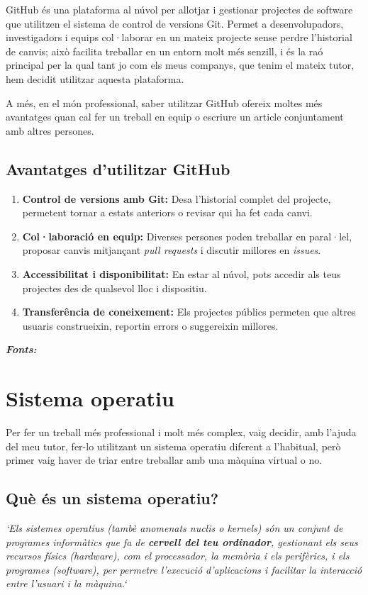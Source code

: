 GitHub és una plataforma al núvol per allotjar i gestionar projectes de software que utilitzen el sistema de control de versions Git. Permet a desenvolupadors, investigadors i equips col·laborar en un mateix projecte sense perdre l’historial de canvis; això facilita treballar en un entorn molt més senzill, i és la raó principal per la qual tant jo com els meus companys, que tenim el mateix tutor, hem decidit utilitzar aquesta plataforma.

A més, en el món professional, saber utilitzar GitHub ofereix moltes més avantatges quan cal fer un treball en equip o escriure un article conjuntament amb altres persones.

\subsection{Avantatges d’utilitzar GitHub}
\begin{enumerate}
 \item \textbf{Control de versions amb Git:} Desa l’historial complet del projecte, permetent tornar a estats anteriors o revisar qui ha fet cada canvi.
 \item \textbf{Col·laboració en equip:} Diverses persones poden treballar en paral·lel, proposar canvis mitjançant \textit{pull requests} i discutir millores en \textit{issues}.
 \item \textbf{Accessibilitat i disponibilitat:} En estar al núvol, pots accedir als teus projectes des de qualsevol lloc i dispositiu.
 \item \textbf{Transferência de coneixement:} Els projectes públics permeten que altres usuaris construeixin, reportin errors o suggereixin millores.
\end{enumerate}

\textit{\textbf{Fonts:}} \cite{GH}



\section{Sistema operatiu}
Per fer un treball més professional i molt més complex, vaig decidir, amb l’ajuda del meu tutor, fer-lo utilitzant un sistema operatiu diferent a l'habitual, però primer vaig haver de triar entre treballar amb una màquina virtual o no.


\subsection{Què és un sistema operatiu?}
\textit{`Els sistemes operatius (tambè anomenats nuclis o kernels) són un conjunt de programes informàtics que fa de \textbf{cervell del teu ordinador}, gestionant els seus recursos físics (hardware), com el processador, la memòria i els perifèrics, i els programes (software), per permetre l'execució d'aplicacions i facilitar la interacció entre l'usuari i la màquina.`}  ~\cite{EE}

